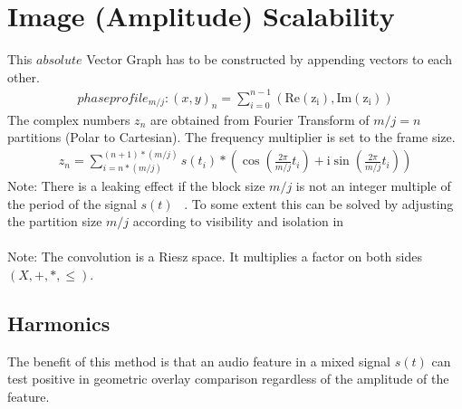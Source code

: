 \documentclass{report}
\begin{document}
\section{Image (Amplitude) Scalability}
This $absolute$ Vector Graph has to be constructed by appending vectors to each other.
\begin{align}
phaseprofile_{m/j}: (x,y)_{n}=\sum \limits _{i=0}^{n-1}(\mathrm{Re(z_{i})},\mathrm{Im(z_{i})})
\end{align}
The complex numbers $z_{n}$ are obtained from Fourier Transform of $m/j=n$ partitions (Polar to Cartesian). The frequency multiplier is set to the frame size.
\begin{align}
z_{n}= \sum \limits _{i=n*(m/j)}^{(n+1)*(m/j)} s(t_{i})*(\cos(\frac{2\pi}{m/j}t_{i})+\mathrm{i}\sin(\frac{2\pi}{m/j}t_{i}))\label{eq:3}
\end{align}
Note: There is a leaking effect if the block size $m/j$ is not an integer multiple of the period of the signal $s(t)$ ~\cite[Fensterfunktion]{Fensterfunktion}. To some extent this can be solved by adjusting the partition size $m/j$ according to visibility and isolation in ~\cite[Stopeight\_Comparator.tex]{Comparator}\\\\
Note: The convolution is a Riesz space. It multiplies a factor on both sides $(X,+,*,\leq)$.
\subsection{Harmonics}
The benefit of this method is that an audio feature in a mixed signal $s(t)$ can test positive in geometric overlay comparison regardless of the amplitude of the feature.

\iffalse
\printbibliography
\fi
{}

\end{document}
